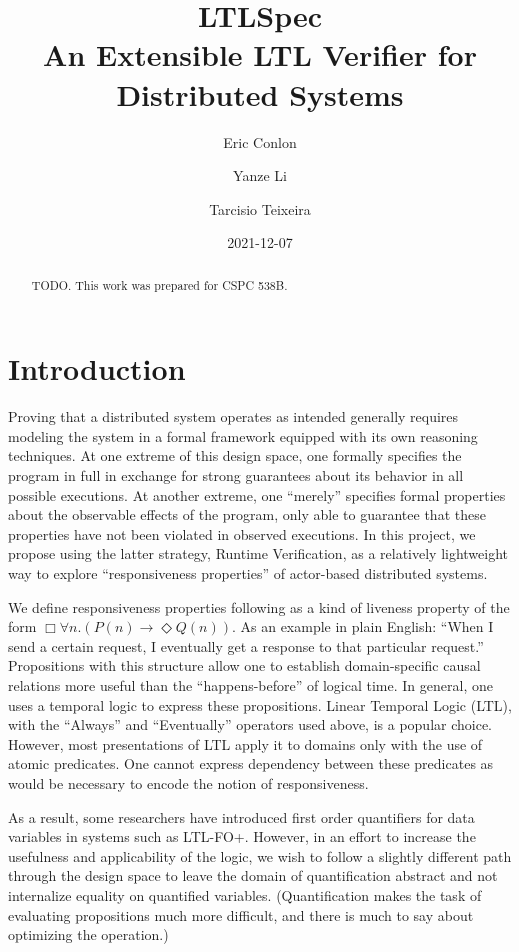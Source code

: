\documentclass[format=acmsmall, nonacm=true, review=true]{acmart}
\title{LTLSpec \\
  \large An Extensible LTL Verifier for Distributed Systems}
\author{Eric Conlon}
\author{Yanze Li}
\author{Tarcisio Teixeira}
\date{2021-12-07}
\begin{document}
\begin{abstract}
TODO. This work was prepared for CSPC 538B.
\end{abstract}

\maketitle

\section{Introduction}

Proving that a distributed system operates as intended generally requires modeling the system in a formal framework equipped with its own reasoning techniques.
At one extreme of this design space, one formally specifies the program in full in exchange for strong guarantees about its behavior in all possible executions.
At another extreme, one “merely” specifies formal properties about the observable effects of the program, only able to guarantee that these properties have not been violated in observed executions.
In this project, we propose using the latter strategy, Runtime Verification, as a relatively lightweight way to explore “responsiveness properties” of actor-based distributed systems.

We define responsiveness properties following \cite{actorservice,parthasarathy2018modular} as a kind of liveness property of the form \(\Box \forall n. (P(n) \rightarrow \Diamond Q(n))\).
As an example in plain English: “When I send a certain request, I eventually get a response to that particular request.” Propositions with this structure allow one to establish domain-specific causal relations more useful than the “happens-before” of logical time.
In general, one uses a temporal logic to express these propositions. Linear Temporal Logic (LTL), with the “Always” and “Eventually” operators used above, is a popular choice. However, most presentations of LTL apply it to domains only with the use of atomic predicates. One cannot express dependency between these predicates as would be necessary to encode the notion of responsiveness.

As a result, some researchers have introduced first order quantifiers for data variables \cite{khoury_automata-based_2021,margaria_execution_2016,halle_runtime_2012} in systems such as LTL-FO+.
However, in an effort to increase the usefulness and applicability of the logic, we wish to follow a slightly different path through the design space to leave the domain of quantification abstract and not internalize equality on quantified variables.
(Quantification makes the task of evaluating propositions much more difficult, and there is much to say about optimizing the operation.)
\end{document}
